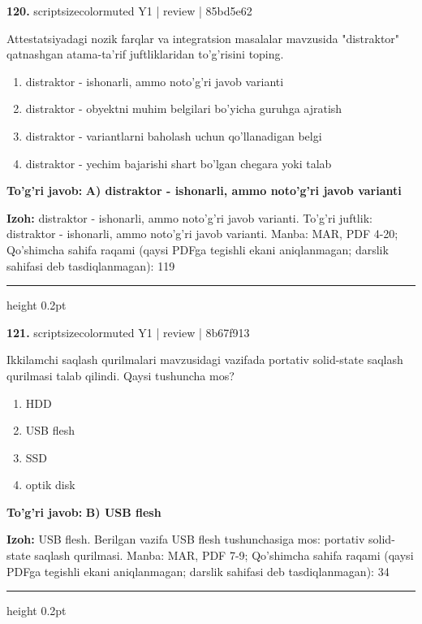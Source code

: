 \documentclass[10pt,a4paper]{article}
\begin{document}
{\bfseries\sffamily\color{ink} 120.} {scriptsizecolor{muted} Y1 | review | 85bd5e62}
\par
Attestatsiyadagi nozik farqlar va integratsion masalalar mavzusida "distraktor" qatnashgan atama-ta'rif juftliklaridan to'g'risini toping.
\begin{enumerate}[label=\Alph*),leftmargin=9mm]
\item distraktor - ishonarli, ammo noto'g'ri javob varianti
\item distraktor - obyektni muhim belgilari bo'yicha guruhga ajratish
\item distraktor - variantlarni baholash uchun qo'llanadigan belgi
\item distraktor - yechim bajarishi shart bo'lgan chegara yoki talab
\end{enumerate}
\begin{tcolorbox}[enhanced,breakable,colback=teal!4,colframe=teal!60!black,boxrule=0.45pt,arc=1.2mm,left=2.7mm,right=2.7mm,top=1.8mm,bottom=1.8mm,before skip=2mm,after skip=2mm]
{\bfseries\sffamily\color{teal}To'g'ri javob:} \textbf{A) distraktor - ishonarli, ammo noto'g'ri javob varianti}
\par\smallskip
{\bfseries Izoh:} distraktor - ishonarli, ammo noto'g'ri javob varianti. To'g'ri juftlik: distraktor - ishonarli, ammo noto'g'ri javob varianti. Manba: MAR, PDF 4-20; Qo'shimcha sahifa raqami (qaysi PDFga tegishli ekani aniqlanmagan; darslik sahifasi deb tasdiqlanmagan): 119
\end{tcolorbox}
\vspace{2mm}\hrule height 0.2pt\vspace{3mm}

{\bfseries\sffamily\color{ink} 121.} {scriptsizecolor{muted} Y1 | review | 8b67f913}
\par
Ikkilamchi saqlash qurilmalari mavzusidagi vazifada portativ solid-state saqlash qurilmasi talab qilindi. Qaysi tushuncha mos?
\begin{enumerate}[label=\Alph*),leftmargin=9mm]
\item HDD
\item USB flesh
\item SSD
\item optik disk
\end{enumerate}
\begin{tcolorbox}[enhanced,breakable,colback=teal!4,colframe=teal!60!black,boxrule=0.45pt,arc=1.2mm,left=2.7mm,right=2.7mm,top=1.8mm,bottom=1.8mm,before skip=2mm,after skip=2mm]
{\bfseries\sffamily\color{teal}To'g'ri javob:} \textbf{B) USB flesh}
\par\smallskip
{\bfseries Izoh:} USB flesh. Berilgan vazifa USB flesh tushunchasiga mos: portativ solid-state saqlash qurilmasi. Manba: MAR, PDF 7-9; Qo'shimcha sahifa raqami (qaysi PDFga tegishli ekani aniqlanmagan; darslik sahifasi deb tasdiqlanmagan): 34
\end{tcolorbox}
\vspace{2mm}\hrule height 0.2pt\vspace{3mm}
\end{document}
